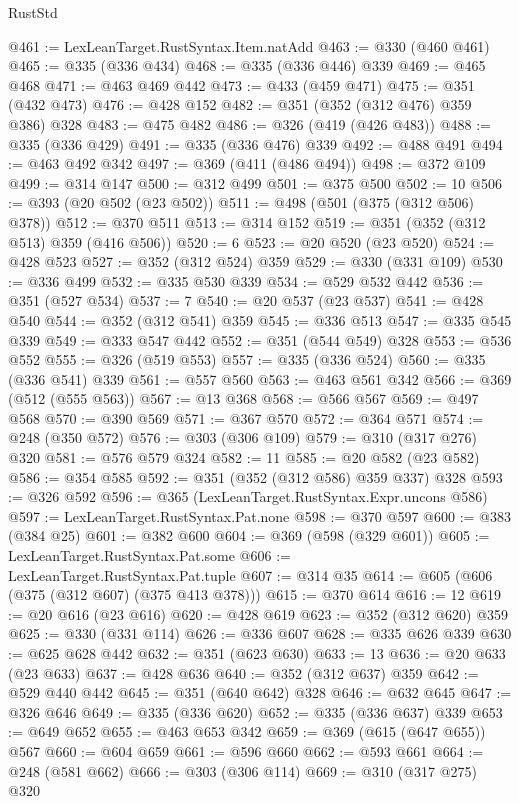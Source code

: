 \begin{lexlean}{RustStd}
\begin{coremodule}
@461 := LexLeanTarget.RustSyntax.Item.natAdd
@463 := @330 (@460 @461)
@465 := @335 (@336 @434)
@468 := @335 (@336 @446) @339
@469 := @465 @468
@471 := @463 @469 @442
@473 := @433 (@459 @471)
@475 := @351 (@432 @473)
@476 := @428 @152
@482 := @351 (@352 (@312 @476) @359 @386) @328
@483 := @475 @482
@486 := @326 (@419 (@426 @483))
@488 := @335 (@336 @429)
@491 := @335 (@336 @476) @339
@492 := @488 @491
@494 := @463 @492 @342
@497 := @369 (@411 (@486 @494))
@498 := @372 @109
@499 := @314 @147
@500 := @312 @499
@501 := @375 @500
@502 := 10
@506 := @393 (@20 @502 (@23 @502))
@511 := @498 (@501 (@375 (@312 @506) @378))
@512 := @370 @511
@513 := @314 @152
@519 := @351 (@352 (@312 @513) @359 (@416 @506))
@520 := 6
@523 := @20 @520 (@23 @520)
@524 := @428 @523
@527 := @352 (@312 @524) @359
@529 := @330 (@331 @109)
@530 := @336 @499
@532 := @335 @530 @339
@534 := @529 @532 @442
@536 := @351 (@527 @534)
@537 := 7
@540 := @20 @537 (@23 @537)
@541 := @428 @540
@544 := @352 (@312 @541) @359
@545 := @336 @513
@547 := @335 @545 @339
@549 := @333 @547 @442
@552 := @351 (@544 @549) @328
@553 := @536 @552
@555 := @326 (@519 @553)
@557 := @335 (@336 @524)
@560 := @335 (@336 @541) @339
@561 := @557 @560
@563 := @463 @561 @342
@566 := @369 (@512 (@555 @563))
@567 := @13 @368
@568 := @566 @567
@569 := @497 @568
@570 := @390 @569
@571 := @367 @570
@572 := @364 @571
@574 := @248 (@350 @572)
@576 := @303 (@306 @109)
@579 := @310 (@317 @276) @320
@581 := @576 @579 @324
@582 := 11
@585 := @20 @582 (@23 @582)
@586 := @354 @585
@592 := @351 (@352 (@312 @586) @359 @337) @328
@593 := @326 @592
@596 := @365 (LexLeanTarget.RustSyntax.Expr.uncons @586)
@597 := LexLeanTarget.RustSyntax.Pat.none
@598 := @370 @597
@600 := @383 (@384 @25)
@601 := @382 @600
@604 := @369 (@598 (@329 @601))
@605 := LexLeanTarget.RustSyntax.Pat.some
@606 := LexLeanTarget.RustSyntax.Pat.tuple
@607 := @314 @35
@614 := @605 (@606 (@375 (@312 @607) (@375 @413 @378)))
@615 := @370 @614
@616 := 12
@619 := @20 @616 (@23 @616)
@620 := @428 @619
@623 := @352 (@312 @620) @359
@625 := @330 (@331 @114)
@626 := @336 @607
@628 := @335 @626 @339
@630 := @625 @628 @442
@632 := @351 (@623 @630)
@633 := 13
@636 := @20 @633 (@23 @633)
@637 := @428 @636
@640 := @352 (@312 @637) @359
@642 := @529 @440 @442
@645 := @351 (@640 @642) @328
@646 := @632 @645
@647 := @326 @646
@649 := @335 (@336 @620)
@652 := @335 (@336 @637) @339
@653 := @649 @652
@655 := @463 @653 @342
@659 := @369 (@615 (@647 @655)) @567
@660 := @604 @659
@661 := @596 @660
@662 := @593 @661
@664 := @248 (@581 @662)
@666 := @303 (@306 @114)
@669 := @310 (@317 @275) @320

\end{coremodule}
\end{lexlean}
